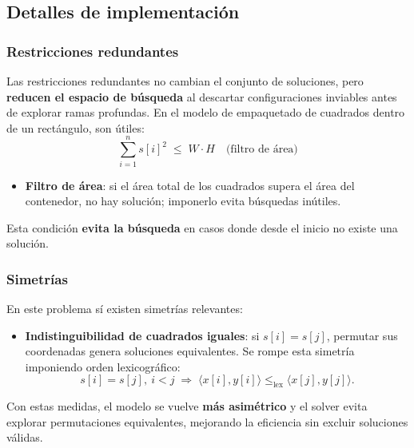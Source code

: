 
\subsection{Detalles de implementación}\label{sec:06-rectangulo-impl}
\subsubsection*{Restricciones redundantes}
Las restricciones redundantes no cambian el conjunto de soluciones, pero \textbf{reducen el espacio de búsqueda} al descartar configuraciones inviables antes de explorar ramas profundas.  
En el modelo de empaquetado de cuadrados dentro de un rectángulo, son útiles:
\[
\sum_{i=1}^{n} s[i]^2 \;\le\; W\cdot H
\quad\text{(filtro de área)}
\]
\begin{itemize}
  \item \textbf{Filtro de área}: si el área total de los cuadrados supera el área del contenedor, no hay solución; imponerlo evita búsquedas inútiles.
\end{itemize}
Esta condición \textbf{evita la búsqueda} en casos donde desde el inicio no existe una solución.

\subsubsection*{Simetrías}
En este problema sí existen simetrías relevantes:
\begin{itemize}
  \item \textbf{Indistinguibilidad de cuadrados iguales}: si \(s[i]=s[j]\), permutar sus coordenadas genera soluciones equivalentes. Se rompe esta simetría imponiendo orden lexicográfico:
  \[
  s[i]=s[j],\ i<j \;\Rightarrow\; \langle x[i],y[i]\rangle \le_{\text{lex}} \langle x[j],y[j]\rangle.
  \]
\end{itemize}
Con estas medidas, el modelo se vuelve \textbf{más asimétrico} y el solver evita explorar permutaciones equivalentes, mejorando la eficiencia sin excluir soluciones válidas.
